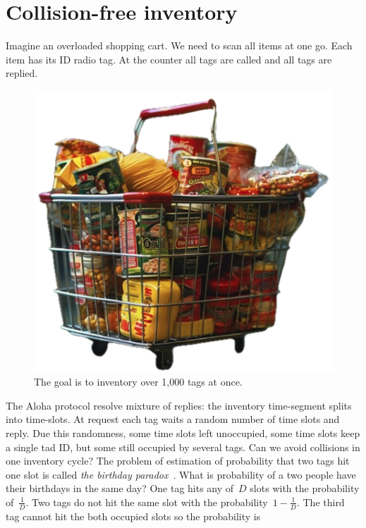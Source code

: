 \documentclass[12pt]{article}
\begin{document}
\section{Collision-free inventory}
Imagine an overloaded shopping cart. We need to scan all items at one go. Each item has its ID radio tag. At the counter all tags are called and all tags are replied.  
\begin{figure}  %
\centering
\includegraphics[width=\linewidth]{fig_shopping-cart}
\caption{The goal is to inventory over 1,000 tags at once.}
\label{fig:pr_p0}
\end{figure}
The Aloha protocol resolve mixture of replies: the inventory time-segment splits into time-slots. At request each tag waits a random number of time slots and reply. Due this randomness, some  time slots left  unoccupied, some time slots keep a single tad ID, but some still occupied by several tags. Can we avoid collisions in one inventory cycle? The problem of estimation of probability that two tags hit one slot is called \emph{the birthday paradox}~\cite{Santos2015,Mosteller1962}. What is probability of a two people have their birthdays in the same day? One tag hits any of~$D$ slots with the probability of~$\frac{1}{D}$. Two tags do not hit the same slot with the probability~$1-\frac{1}{D}$. The third tag cannot hit the both occupied slots so the probability is
\end{document}
